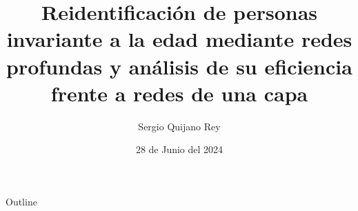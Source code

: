 \documentclass{beamer}
\title{Reidentificación de personas invariante a la edad mediante redes profundas y análisis de su eficiencia frente a redes de una capa}
\author[Sergio Quijano Rey]{Sergio Quijano Rey}
\date[28/06/2024]{28 de Junio del 2024}
\begin{document}
\begin{frame}
	\titlepage
\end{frame}

\begin{frame}{Outline}
	\tableofcontents
\end{frame}



\end{document}
